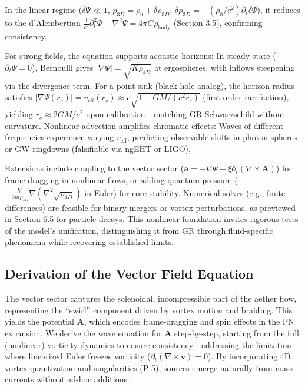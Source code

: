 \documentclass{article}
\begin{document}
In the linear regime ($\delta \Psi \ll 1$, $\rho_{3D} = \rho_0 + \delta \rho_{3D}$, $\delta \rho_{3D} = -(\rho_0 / c^2) \partial_t \delta \Psi$), it reduces to the d'Alembertian $\frac{1}{c^2} \partial_t^2 \Psi - \nabla^2 \Psi = 4\pi G \rho_{\text{body}}$ (Section 3.5), confirming consistency.

For strong fields, the equation supports acoustic horizons: In steady-state ($\partial_t \Psi = 0$), Bernoulli gives $|\nabla \Psi| = \sqrt{K \rho_{4D}}$ at ergospheres, with inflows steepening via the divergence term. For a point sink (black hole analog), the horizon radius satisfies $|\nabla \Psi(r_s)| = v_{\text{eff}}(r_s) \approx c \sqrt{1 - GM/(c^2 r_s)}$ (first-order rarefaction), yielding $r_s \approx 2GM/c^2$ upon calibration---matching GR Schwarzschild without curvature. Nonlinear advection amplifies chromatic effects: Waves of different frequencies experience varying $v_{\text{eff}}$, predicting observable shifts in photon spheres or GW ringdowns (falsifiable via ngEHT or LIGO).

Extensions include coupling to the vector sector ($\mathbf{a} = -\nabla \Psi + \xi \partial_t (\nabla \times \mathbf{A})$) for frame-dragging in nonlinear flows, or adding quantum pressure ($-\frac{\hbar^2}{2m \rho_{4D}} \nabla (\nabla^2 \sqrt{\rho_{4D}})$ in Euler) for core stability. Numerical solves (e.g., finite differences) are feasible for binary mergers or vortex perturbations, as previewed in Section 6.5 for particle decays. This nonlinear foundation invites rigorous tests of the model's unification, distinguishing it from GR through fluid-specific phenomena while recovering established limits.

\subsection{Derivation of the Vector Field Equation}

The vector sector captures the solenoidal, incompressible part of the aether flow, representing the ``swirl'' component driven by vortex motion and braiding. This yields the potential $\mathbf{A}$, which encodes frame-dragging and spin effects in the PN expansion. We derive the wave equation for $\mathbf{A}$ step-by-step, starting from the full (nonlinear) vorticity dynamics to ensure consistency---addressing the limitation where linearized Euler freezes vorticity ($\partial_t (\nabla \times \mathbf{v}) = 0$). By incorporating 4D vortex quantization and singularities (P-5), sources emerge naturally from mass currents without ad-hoc additions.
\end{document}
